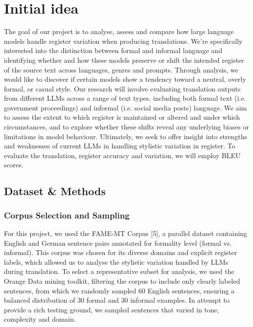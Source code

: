 \documentclass[fleqn,moreauthors,10pt]{ds_report}
\begin{document}
	
	
	
	\section*{Initial idea}
	The goal of our project is to analyse, assess and compare how large language models handle register variation when producing translations. We’re specifically interested into the distinction between formal and informal language and identifying whether and how these models preserve or shift the intended register of the source text across languages, genres and prompts. Through analysis, we would like to discover if certain models show a tendency toward a neutral, overly formal, or casual style.
	Our research will involve evaluating translation outputs from different LLMs across a range of text types, including both formal text (i.e. government proceedings) and informal (i.e. social media posts) language. We aim to assess the extent to which register is maintained or altered and under which circumstances, and to explore whether these shifts reveal any underlying biases or limitations in model behaviour. Ultimately, we seek to offer insight into strengths and weaknesses of current LLMs in handling stylistic variation in register.
	To evaluate the translation, register accuracy and variation, we will employ BLEU scores.
	
	
	\subsection*{Dataset \& Methods}
	
	\subsubsection*{Corpus Selection and Sampling}
	
For this project, we used the FAME-MT Corpus [5], a parallel dataset containing English and German sentence pairs annotated for formality level (formal vs. informal). This corpus was chosen for its diverse domains and explicit register labels, which allowed us to analyse the stylistic variation handled by LLMs during translation. 
To select a representative subset for analysis, we used the Orange Data mining toolkit, filtering the corpus to include only clearly labeled sentences, from which we randomly sampled 60 English sentences, ensuring a balanced distribution of 30 formal and 30 informal examples. In attempt to provide a rich testing ground, we sampled sentences that varied in tone, complexity and domain.
\end{document}
